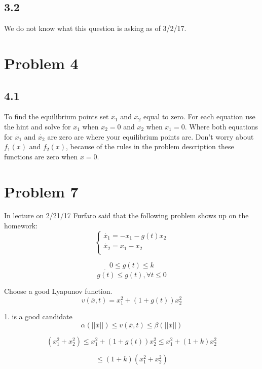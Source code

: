 \documentclass[12pt]{article}
\begin{document}
\subsection*{3.2}
We do not know what this question is asking as of 3/2/17.

\section*{Problem 4}
\subsection*{4.1}
To find the equilibrium points set $\dot{x_1}$ and $\dot{x_2}$ equal to zero. For each equation use the hint and solve for $x_1$ when $x_2=0$ and $x_2$ when $x_1=0$. Where both equations for $\dot{x_1}$ and $\dot{x_2}$ are zero are where your equilibrium points are. Don't worry about $f_1(x)$ and $f_2(x)$, because of the rules in the problem description these functions are zero when $x=0$.

\section*{Problem 7}
In lecture on 2/21/17 Furfaro said that the following problem shows up on the homework:
$$\begin{cases}\dot{x_1}=-x_1-g(t)x_2\\ 
\dot{x_2}=x_1-x_2\\
\end{cases}$$ 

$$0\leq g(t)\leq k$$
$$\dot{g(t)} \leq g(t), \forall t \leq 0$$

Choose a good Lyapunov function. 
$$v(\bar{x},t)=x_1^2+(1+g(t))x_2^2$$

1. is a good candidate\\
$$\alpha(||\bar{x}||)\leq v(\bar{x},t)\leq \beta(||\bar{x}||)$$

$$(x_1^2+x_2^2)\leq x_1^2+(1+g(t))x_2^2\leq x_1^2+(1+k)x_2^2$$

$$\leq(1+k)(x_1^2+x_2^2)$$
\end{document}
